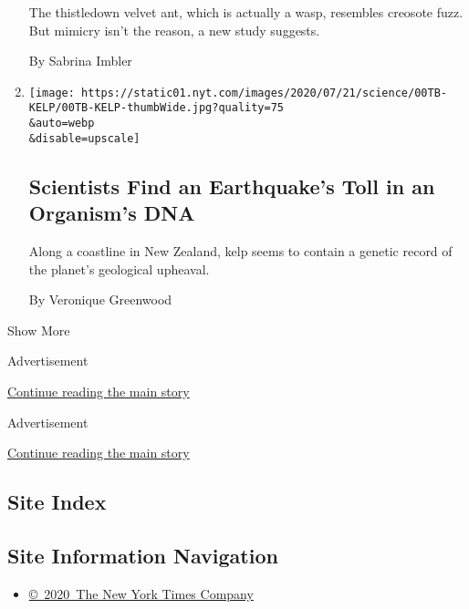 \begin{enumerate}
  The thistledown velvet ant, which is actually a wasp, resembles
  creosote fuzz. But mimicry isn't the reason, a new study suggests.

  By Sabrina Imbler
\item
  \href{/2020/07/14/science/earthquake-dna-genes-kelp.html}{}

  \texttt{[image: https://static01.nyt.com/images/2020/07/21/science/00TB-KELP/00TB-KELP-thumbWide.jpg?quality=75\\\&auto=webp\\\&disable=upscale]}

  \hypertarget{scientists-find-an-earthquakes-toll-in-an-organisms-dna}{%
  \subsection{Scientists Find an Earthquake's Toll in an Organism's
  DNA}\label{scientists-find-an-earthquakes-toll-in-an-organisms-dna}}

  Along a coastline in New Zealand, kelp seems to contain a genetic
  record of the planet's geological upheaval.

  By Veronique Greenwood
\end{enumerate}

Show More

Advertisement

\protect\hyperlink{after-mid1}{Continue reading the main story}

Advertisement

\protect\hyperlink{after-mktg}{Continue reading the main story}

\hypertarget{site-index}{%
\subsection{Site Index}\label{site-index}}

\hypertarget{site-information-navigation}{%
\subsection{Site Information
Navigation}\label{site-information-navigation}}

\begin{itemize}
\tightlist
\item
  \href{https://help.nytimes.com/hc/en-us/articles/115014792127-Copyright-notice}{©~2020~The
  New York Times Company}
\end{itemize}

